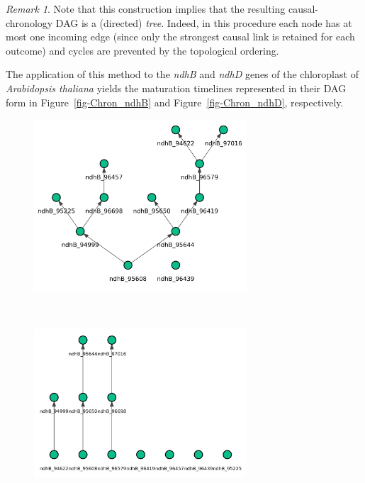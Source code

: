 \documentclass[
]{article}
\theoremstyle{definition}
\theoremstyle{remark}
\newtheorem{refremark}{Remark}[section]
\begin{document}
\begin{refremark}
Note that this construction implies that the resulting causal-chronology
DAG is a (directed) \emph{tree}. Indeed, in this procedure each node has
at most one incoming edge (since only the strongest causal link is
retained for each outcome) and cycles are prevented by the topological
ordering.

\label{rem-chron_tree}

\end{refremark}

The application of this method to the \emph{ndhB} and \emph{ndhD} genes
of the chloroplast of \emph{Arabidopsis thaliana} yields the maturation
timelines represented in their DAG form in Figure~\ref{fig-Chron_ndhB}
and Figure~\ref{fig-Chron_ndhD}, respectively.

\begin{figure}[H]

\begin{minipage}{0.43\linewidth}

\includegraphics[width=3.125in,height=\textheight,keepaspectratio]{Figures Causal Chronology/chron_DAG_HC_ndhB.png}

\end{minipage}%
%
\begin{minipage}{0.13\linewidth}
~\end{minipage}%
%
\begin{minipage}{0.43\linewidth}

\includegraphics[width=3.125in,height=\textheight,keepaspectratio]{Figures Causal Chronology/chron_DAG_PC_ndhB.png}


\end{minipage}
\end{figure}
\end{document}
